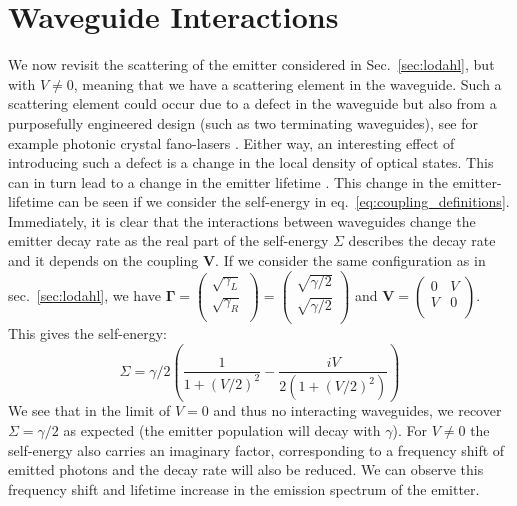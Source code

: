 \section{Waveguide Interactions \label{sec:waveguideIO}}
We now revisit the scattering of the emitter considered in Sec.~\eqref{sec:lodahl}, but with $V \neq 0$, meaning that we have a scattering element in the waveguide. Such a scattering element could occur due to a defect in the waveguide but also from a purposefully engineered design (such as two terminating waveguides), see for example photonic crystal fano-lasers \cite{Yu2014FanoSwitching,Yu2017DemonstrationLaser}. Either way, an interesting effect of introducing such a defect is a change in the local density of optical states. This can in turn lead to a change in the emitter lifetime \cite{Joanesarson2020Few-photonGeometries}. This change in the emitter-lifetime can be seen if we consider the self-energy in eq.~\eqref{eq:coupling_definitions}. Immediately, it is clear that the interactions between waveguides change the emitter decay rate as the real part of the self-energy $\Sigma$ describes the decay rate and it depends on the coupling $\mathbf{V}$. If we consider the same configuration as in sec.~\ref{sec:lodahl}, we have $\mathbf{\Gamma} = \begin{pmatrix}
    \sqrt{\gamma_L} \\
    \sqrt{\gamma_R} \\
\end{pmatrix}= \begin{pmatrix}
    \sqrt{\gamma/2} \\
    \sqrt{\gamma/2} \\
\end{pmatrix}$ and $\mathbf{V} =\begin{pmatrix}
    0 & V \\
    V & 0 \\
\end{pmatrix}$. This gives the self-energy:
\begin{equation}
    \Sigma = \gamma/2\left( \frac{1}{1+(V/2)^2} - \frac{i V}{2(1+(V/2)^2)} \right) \label{eq:self}
\end{equation}
We see that in the limit of $V=0$ and thus no interacting waveguides, we recover $\Sigma = \gamma/2$ as expected (the emitter population will decay with $\gamma$). For $V \neq 0$ the self-energy also carries an imaginary factor, corresponding to a frequency shift of emitted photons and the decay rate will also be reduced. We can observe this frequency shift and lifetime increase in the emission spectrum of the emitter.

